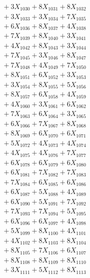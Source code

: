 \documentclass[a4paper,10pt]{article}
\begin{document}
{\begin{align}
&\;  + 3 X_{1030} + 8 X_{1031} + 8 X_{1032} \\[0.3ex]
&\;  + 3 X_{1033} + 3 X_{1034} + 7 X_{1035} \\[0.3ex]
&\;  + 6 X_{1036} + 8 X_{1037} + 4 X_{1038} \\[0.3ex]
&\;  + 7 X_{1039} + 8 X_{1040} + 3 X_{1041} \\[0.3ex]
&\;  + 4 X_{1042} + 8 X_{1043} + 3 X_{1044} \\[0.3ex]
&\;  + 7 X_{1045} + 3 X_{1046} + 8 X_{1047} \\[0.3ex]
&\;  + 7 X_{1048} + 4 X_{1049} + 7 X_{1050} \\[0.3ex]
&\;  + 8 X_{1051} + 6 X_{1052} + 3 X_{1053} \\[0.3ex]
&\;  + 3 X_{1054} + 8 X_{1055} + 5 X_{1056} \\[0.3ex]
&\;  + 8 X_{1057} + 6 X_{1058} + 4 X_{1059} \\[0.5ex]\allowbreak
&\;  + 4 X_{1060} + 3 X_{1061} + 6 X_{1062} \\[0.3ex]
&\;  + 7 X_{1063} + 6 X_{1064} + 3 X_{1065} \\[0.3ex]
&\;  + 6 X_{1066} + 7 X_{1067} + 8 X_{1068} \\[0.3ex]
&\;  + 8 X_{1069} + 6 X_{1070} + 6 X_{1071} \\[0.3ex]
&\;  + 5 X_{1072} + 4 X_{1073} + 4 X_{1074} \\[0.3ex]
&\;  + 4 X_{1075} + 4 X_{1076} + 7 X_{1077} \\[0.3ex]
&\;  + 6 X_{1078} + 6 X_{1079} + 6 X_{1080} \\[0.3ex]
&\;  + 6 X_{1081} + 7 X_{1082} + 7 X_{1083} \\[0.3ex]
&\;  + 7 X_{1084} + 6 X_{1085} + 6 X_{1086} \\[0.3ex]
&\;  + 6 X_{1087} + 5 X_{1088} + 4 X_{1089} \\[0.5ex]\allowbreak
&\;  + 6 X_{1090} + 5 X_{1091} + 7 X_{1092} \\[0.3ex]
&\;  + 7 X_{1093} + 7 X_{1094} + 5 X_{1095} \\[0.3ex]
&\;  + 6 X_{1096} + 6 X_{1097} + 4 X_{1098} \\[0.3ex]
&\;  + 5 X_{1099} + 8 X_{1100} + 4 X_{1101} \\[0.3ex]
&\;  + 4 X_{1102} + 8 X_{1103} + 8 X_{1104} \\[0.3ex]
&\;  + 8 X_{1105} + 7 X_{1106} + 6 X_{1107} \\[0.3ex]
&\;  + 8 X_{1108} + 8 X_{1109} + 8 X_{1110} \\[0.3ex]
&\;  + 3 X_{1111} + 5 X_{1112} + 8 X_{1113} \\[0.3ex]

\end{align}}
\end{document}
